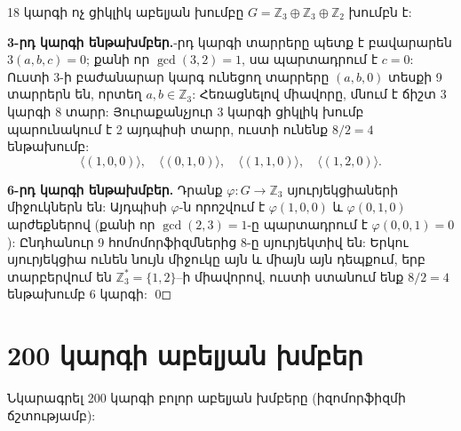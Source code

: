 \documentclass[12pt,a4paper]{article}
\newcommand{\armtext}{} %
\newenvironment{problem}{\begin{mdframed}[style=problemstyle]\armtext}{\end{mdframed}}
\newenvironment{sol}{\begin{mdframed}[style=solstyle]\armtext}{\end{mdframed}}
\newcommand{\Z}{\mathbb{Z}}
\newcommand{\gen}[1]{\langle #1 \rangle}
\begin{document}
\begin{sol}
18 կարգի ոչ ցիկլիկ աբելյան խումբը $G = \Z_3 \oplus \Z_3 \oplus \Z_2$ խումբն է:

\medskip
\textbf{\color{SectCol}3-րդ կարգի ենթախմբեր.}-րդ կարգի տարրերը պետք է բավարարեն $3(a,b,c) = 0$; քանի որ $\gcd(3,2)=1$, սա
պարտադրում է $c=0$: Ուստի 3-ի բաժանարար կարգ ունեցող տարրերը $(a,b,0)$ տեսքի 9 տարրերն են,
որտեղ $a,b \in \Z_3$: Հեռացնելով միավորը, մնում է ճիշտ 3 կարգի 8 տարր:
Յուրաքանչյուր 3 կարգի ցիկլիկ խումբ պարունակում է 2 այդպիսի տարր,
ուստի ունենք $8/2 = \boxed{4}$ ենթախումբ:
\[
  \gen{(1,0,0)}, \quad \gen{(0,1,0)}, \quad \gen{(1,1,0)}, \quad \gen{(1,2,0)}.
\]

\textbf{\color{SectCol}6-րդ կարգի ենթախմբեր.}\;
Դրանք $\varphi\colon G \to \Z_3$ սյուրյեկցիաների միջուկներն են: Այդպիսի $\varphi$-ն
որոշվում է $\varphi(1,0,0)$ և $\varphi(0,1,0)$ արժեքներով (քանի որ $\gcd(2,3)=1$-ը պարտադրում է
$\varphi(0,0,1)=0$): Ընդհանուր 9 հոմոմորֆիզմներից 8-ը սյուրյեկտիվ են:
Երկու սյուրյեկցիա ունեն նույն միջուկը այն և միայն այն դեպքում, երբ տարբերվում են $\Z_3^* = \{1,2\}$--ի միավորով,
ուստի ստանում ենք $8/2 = \boxed{4}$ ենթախումբ 6 կարգի: \qed
\end{sol}

\bigskip
\section{\armtext{200 կարգի աբելյան խմբեր}}

\begin{problem}
Նկարագրել 200 կարգի բոլոր աբելյան խմբերը (իզոմորֆիզմի ճշտությամբ):
\end{problem}
\end{document}
